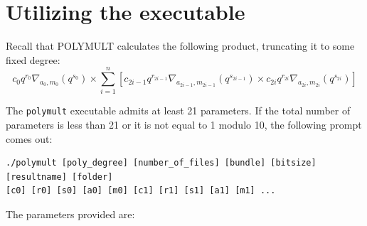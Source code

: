 \documentclass[a4paper,10pt]{article}
\newcommand{\code}{\lstinline}
\begin{document}
%
%
%
%
%
%
%

\section{Utilizing the executable} \label{sec:polymult_exe}

Recall that POLYMULT calculates the following product, truncating it to some fixed degree:
%
$$
c_0q^{r_0}\nabla_{a_0, m_0}(q^{s_0}) \times \sum\limits_{i= 1}^n \left[c_{2i - 1}q^{r_{2i - 1}}\nabla_{a_{2i - 1}, m_{2i - 1}}(q^{s_{2i - 1}}) \times c_{2i}q^{r_{2i}}\nabla_{a_{2i}, m_{2i}}(q^{s_{2i}})\right]
$$

The \code{polymult} executable admits at least 21 parameters. If the total number of parameters is less than 21 or it is not equal to 1 modulo 10, the following prompt comes out:

\begin{lstlisting}
./polymult [poly_degree] [number_of_files] [bundle] [bitsize] [resultname] [folder]
[c0] [r0] [s0] [a0] [m0] [c1] [r1] [s1] [a1] [m1] ...
\end{lstlisting}

The parameters provided are:
\end{document}
